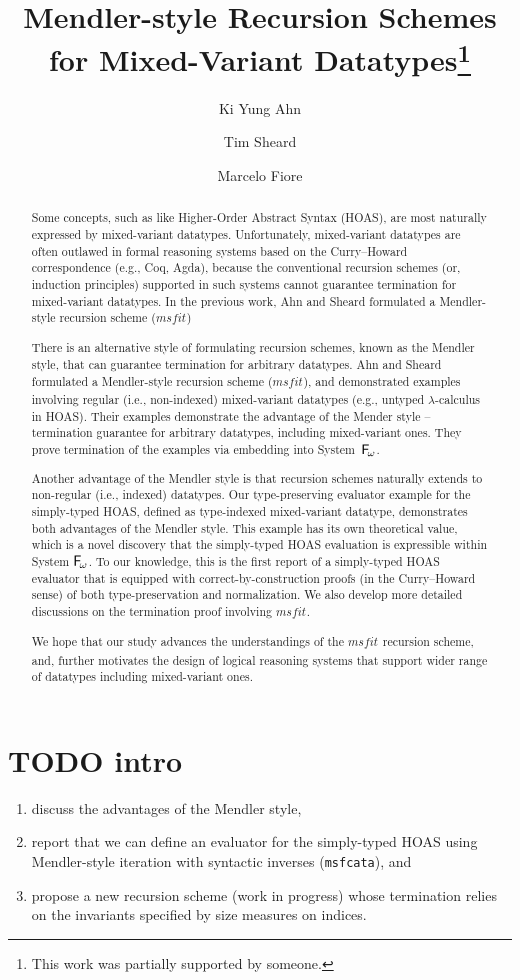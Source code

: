 \documentclass[a4paper,UKenglish]{lipics}
\title{Mendler-style Recursion Schemes for Mixed-Variant Datatypes\footnote{
	This work was partially supported by someone.} }
\author[1]{Ki Yung Ahn}
\author[1]{Tim Sheard}
\author[2]{Marcelo Fiore}
\affil[1]{Department of Computer Science, Portland State University\\
  Oregon, USA\\
  \texttt{\{kya,sheard\}@cs.pdx.edu}}
\affil[2]{Computer Laboratory, University of Cambridge\\
  Cambridge, UK\\
  \texttt{Marcelo.Fiore@cl.cam.ac.uk}}
\newcommand{\eg}[0]{{e.g.}}
\newcommand{\ie}[0]{{i.e.}}
\newcommand{\Fw}[0]{{\ensuremath{\mathsf{\uppercase{F}}_{\!\omega}}}}
\newcommand{\msfit}[1]{\ensuremath{\textit{msfit}_{#1}}}
\begin{document}
\maketitle

\begin{abstract}
Some concepts, such as like Higher-Order Abstract Syntax (HOAS),
are most naturally expressed by mixed-variant datatypes. Unfortunately,
mixed-variant datatypes are often outlawed in formal reasoning systems
based on the Curry--Howard correspondence (\eg, Coq, Agda), because
the conventional recursion schemes (or, induction principles) supported in
such systems cannot guarantee termination for mixed-variant datatypes.
In the previous work, Ahn and Sheard \cite{AhnShe11} formulated
a Mendler-style recursion scheme (\msfit{})

There is an alternative style of formulating recursion schemes,
known as the Mendler style, that can guarantee termination for
arbitrary datatypes. Ahn and Sheard \cite{AhnShe11} formulated
a Mendler-style recursion scheme (\msfit{}), and demonstrated
examples involving regular (\ie, non-indexed) mixed-variant datatypes
(\eg, untyped $\lambda$-calculus in HOAS). Their examples demonstrate
the advantage of the Mender style -- termination guarantee for
arbitrary datatypes, including mixed-variant ones. They prove
termination of the examples via embedding into System~\Fw.

Another advantage of the Mendler style is that recursion schemes 
naturally extends to non-regular (\ie, indexed) datatypes. Our
type-preserving evaluator example for the simply-typed HOAS,
defined as type-indexed mixed-variant datatype, demonstrates
both advantages of the Mendler style. This example has its own
theoretical value, which is a novel discovery that
the simply-typed HOAS evaluation is expressible within System \Fw.
To our knowledge, this is the first report of a simply-typed HOAS
evaluator that is equipped with correct-by-construction proofs
(in the Curry--Howard sense) of both type-preservation and normalization.
We also develop more detailed discussions on the termination proof
involving \msfit{}.

We hope that our study advances the understandings of the \msfit{}
recursion scheme, and, further motivates the design of
logical reasoning systems that support wider range of
datatypes including mixed-variant ones.
\end{abstract}

\section{TODO intro}
\begin{enumerate}
	\item discuss the advantages of the Mendler style,
	\item report that we can define an evaluator for the simply-typed HOAS
		using Mendler-style iteration with syntactic inverses
		(\lstinline{msfcata}), and
	\item propose a new recursion scheme (work in progress) whose
		termination relies on the invariants specified by
		size measures on indices.
\end{enumerate}
\end{document}
